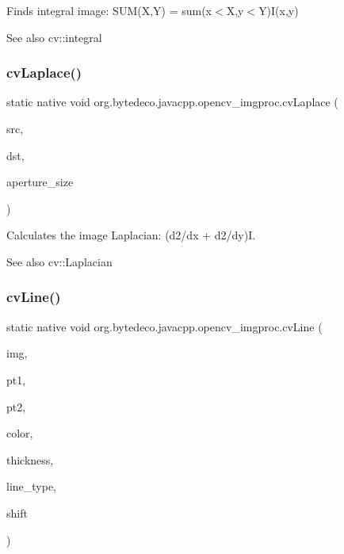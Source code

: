 Finds integral image\+: S\+U\+M(\+X,\+Y) = sum(x$<$\+X,y$<$\+Y)I(x,y) 

\begin{DoxySeeAlso}{See also}
cv\+::integral 
\end{DoxySeeAlso}
\mbox{\label{group__imgproc__c_ga4b503d9c276d19dbced13ecd77b845a2}} 
\subsubsection{\texorpdfstring{cv\+Laplace()}{cvLaplace()}}
{\footnotesize\ttfamily static native void org.\+bytedeco.\+javacpp.\+opencv\+\_\+imgproc.\+cv\+Laplace (\begin{DoxyParamCaption}\item[{@Const Cv\+Arr}]{src,  }\item[{Cv\+Arr}]{dst,  }\item[{int}]{aperture\+\_\+size }\end{DoxyParamCaption})\hspace{0.3cm}{\ttfamily [static]}}



Calculates the image Laplacian\+: (d2/dx + d2/dy)I. 

\begin{DoxySeeAlso}{See also}
cv\+::\+Laplacian 
\end{DoxySeeAlso}
\mbox{\label{group__imgproc__c_ga98780c8da54f8a1c4de80969b71395fd}} 
\subsubsection{\texorpdfstring{cv\+Line()}{cvLine()}}
{\footnotesize\ttfamily static native void org.\+bytedeco.\+javacpp.\+opencv\+\_\+imgproc.\+cv\+Line (\begin{DoxyParamCaption}\item[{Cv\+Arr}]{img,  }\item[{@By\+Val Cv\+Point}]{pt1,  }\item[{@By\+Val Cv\+Point}]{pt2,  }\item[{@By\+Val Cv\+Scalar}]{color,  }\item[{int}]{thickness,  }\item[{int}]{line\+\_\+type,  }\item[{int}]{shift }\end{DoxyParamCaption})\hspace{0.3cm}{\ttfamily [static]}}




